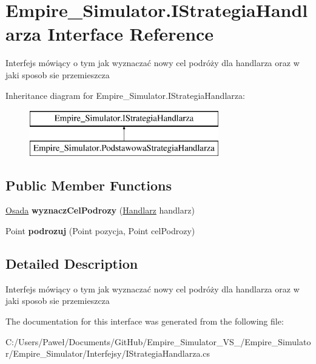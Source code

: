 \hypertarget{interface_empire___simulator_1_1_i_strategia_handlarza}{\section{Empire\+\_\+\+Simulator.\+I\+Strategia\+Handlarza Interface Reference}
\label{interface_empire___simulator_1_1_i_strategia_handlarza}
}


Interfejs mówiący o tym jak wyznaczać nowy cel podróży dla handlarza oraz w jaki sposob sie przemieszcza  


Inheritance diagram for Empire\+\_\+\+Simulator.\+I\+Strategia\+Handlarza\+:\begin{figure}[H]
\begin{center}
\leavevmode
\includegraphics[height=2.000000cm]{interface_empire___simulator_1_1_i_strategia_handlarza}
\end{center}
\end{figure}
\subsection*{Public Member Functions}
\begin{DoxyCompactItemize}
\item 
\hypertarget{interface_empire___simulator_1_1_i_strategia_handlarza_af25c83bc6cd7cd012f16d15f5a5afe40}{\hyperlink{class_empire___simulator_1_1_osada}{Osada} {\bfseries wyznacz\+Cel\+Podrozy} (\hyperlink{class_empire___simulator_1_1_handlarz}{Handlarz} handlarz)}\label{interface_empire___simulator_1_1_i_strategia_handlarza_af25c83bc6cd7cd012f16d15f5a5afe40}

\item 
\hypertarget{interface_empire___simulator_1_1_i_strategia_handlarza_a6e2c9e3d418438ccb4e4aca310b3bc45}{Point {\bfseries podrozuj} (Point pozycja, Point cel\+Podrozy)}\label{interface_empire___simulator_1_1_i_strategia_handlarza_a6e2c9e3d418438ccb4e4aca310b3bc45}

\end{DoxyCompactItemize}


\subsection{Detailed Description}
Interfejs mówiący o tym jak wyznaczać nowy cel podróży dla handlarza oraz w jaki sposob sie przemieszcza 



The documentation for this interface was generated from the following file\+:\begin{DoxyCompactItemize}
\item 
C\+:/\+Users/\+Paweł/\+Documents/\+Git\+Hub/\+Empire\+\_\+\+Simulator\+\_\+\+V\+S\+\_/\+Empire\+\_\+\+Simulator/\+Empire\+\_\+\+Simulator/\+Interfejsy/I\+Strategia\+Handlarza.\+cs\end{DoxyCompactItemize}
